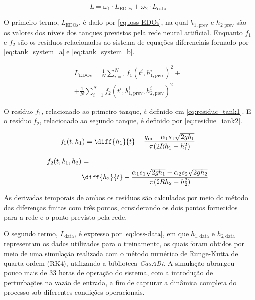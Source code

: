 \begin{equation}
  L = \omega_1 \cdot L_{\mathrm{EDOs}} + \omega_2 \cdot L_{\mathrm{data}}
  \label{eq:loss}
\end{equation}

O primeiro termo, $L_{\mathrm{EDOs}}$, é dado por \eqref{eq:loss-EDOs}, na qual $h_{1, \mathrm{prev}}$ e $h_{2, \mathrm{prev}}$ são os valores dos níveis dos tanques previstos pela rede neural artificial. Enquanto $f_1$ e $f_2$ são os resíduos relacionados ao sistema de equações diferenciais formado por \eqref{eq:tank_system_a} e \eqref{eq:tank_system_b}.

\begin{equation}
  \begin{split}
    L_{\mathrm{EDOs}} = \frac{1}{N} \sum_{i = 1}^{N}
    f_1(t^i, h_{1, \mathrm{prev}}^{i})^2 + \\
    + \frac{1}{N} \sum_{i = 1}^{N}
    f_2(t^i, h_{1, \mathrm{prev}}^{i}, h_{2, \mathrm{prev}}^{i})^2
    \label{eq:loss-EDOs}
  \end{split}
\end{equation}

O resíduo $f_1$, relacionado ao primeiro tanque, é definido em \eqref{eq:residue_tank1}. E o resíduo $f_2$, relacionado ao segundo tanque, é definido por \eqref{eq:residue_tank2}.

\begin{equation}
  \label{eq:residue_tank1}
  f_1(t, h_1) =
  \diff{h_1}{t} - \frac{
    q_{\mathrm{in}} - \alpha_1 s_1 \sqrt{2gh_1}
  }{
    \pi (2 R h_1 - h_1^2)
  }
\end{equation}

\begin{equation}
  \label{eq:residue_tank2}
  \begin{split}
    f_2(t, h_1, h_2) & =                      \\
                     & \diff{h_2}{t} - \frac{
      \alpha_1 s_1 \sqrt{2gh_1} - \alpha_2 s_2 \sqrt{2gh_2}
    }{
      \pi (2 R h_2 - h_2^2)
    }
  \end{split}
\end{equation}

As derivadas temporais de ambos os resíduos são calculadas por meio do método das diferenças finitas com três pontos, considerando os dois pontos fornecidos para a rede e o ponto previsto pela rede.

O segundo termo, $L_{\mathrm{data}}$, é expresso por \eqref{eq:loss-data}, em que $h_{1, \mathrm{data}}$ e $h_{2, \mathrm{data}}$ representam os dados utilizados para o treinamento, os quais foram obtidos por meio de uma simulação realizada com o método numérico de Runge-Kutta de quarta ordem (RK4), utilizando a biblioteca \textit{CasADi}. A simulação abrangeu pouco mais de 33 horas de operação do sistema, com a introdução de perturbações na vazão de entrada, a fim de capturar a dinâmica completa do processo sob diferentes condições operacionais.

